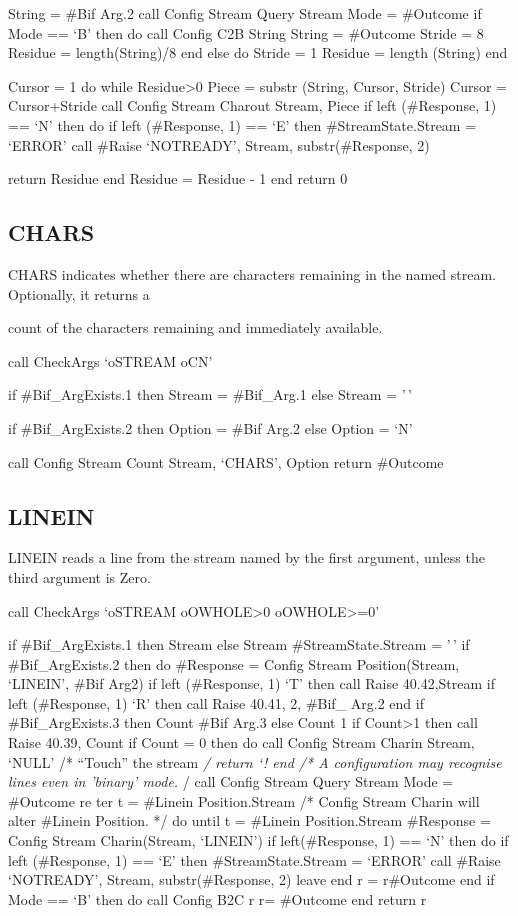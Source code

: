 String = \#Bif Arg.2 call Config Stream Query Stream Mode = \#Outcome if
Mode == `B' then do call Config C2B String String = \#Outcome Stride = 8
Residue = length(String)/8 end else do Stride = 1 Residue = length
(String) end

Cursor = 1 do while Residue\textgreater0 Piece = substr (String, Cursor,
Stride) Cursor = Cursor+Stride call Config Stream Charout Stream, Piece
if left (\#Response, 1) == `N' then do if left (\#Response, 1) == `E'
then \#StreamState.Stream = `ERROR' call \#Raise `NOTREADY', Stream,
substr(\#Response, 2)

return Residue end Residue = Residue - 1 end return 0

\hypertarget{chars}{%
\subsection{CHARS}\label{chars}}

CHARS indicates whether there are characters remaining in the named
stream. Optionally, it returns a

count of the characters remaining and immediately available.

call CheckArgs `oSTREAM oCN'

if \#Bif\_ArgExists.1 then Stream = \#Bif\_Arg.1 else Stream = '\,'

if \#Bif\_ArgExists.2 then Option = \#Bif Arg.2 else Option = `N'

call Config Stream Count Stream, `CHARS', Option return \#Outcome

\hypertarget{linein}{%
\subsection{LINEIN}\label{linein}}

LINEIN reads a line from the stream named by the first argument, unless
the third argument is Zero.

call CheckArgs `oSTREAM oOWHOLE\textgreater0 oOWHOLE\textgreater=0'

if \#Bif\_ArgExists.1 then Stream else Stream \#StreamState.Stream =
'\,' if \#Bif\_ArgExists.2 then do \#Response = Config Stream
Position(Stream, `LINEIN', \#Bif Arg2) if left (\#Response, 1) `T' then
call Raise 40.42,Stream if left (\#Response, 1) `R' then call Raise
40.41, 2, \#Bif\_ Arg.2 end if \#Bif\_ArgExists.3 then Count \#Bif Arg.3
else Count 1 if Count\textgreater1 then call Raise 40.39, Count if Count
= 0 then do call Config Stream Charin Stream, `NULL' /* ``Touch'' the
stream \emph{/ return `! end /* A configuration may recognise lines even
in 'binary' mode. }/ call Config Stream Query Stream Mode = \#Outcome re
ter t = \#Linein Position.Stream /* Config Stream Charin will alter
\#Linein Position. */ do until t = \#Linein Position.Stream \#Response =
Config Stream Charin(Stream, `LINEIN') if left(\#Response, 1) == `N'
then do if left (\#Response, 1) == `E' then \#StreamState.Stream =
`ERROR' call \#Raise `NOTREADY', Stream, substr(\#Response, 2) leave end
r = r\textbar\textbar\#Outcome end if Mode == `B' then do call Config
B2C r r= \#Outcome end return r

